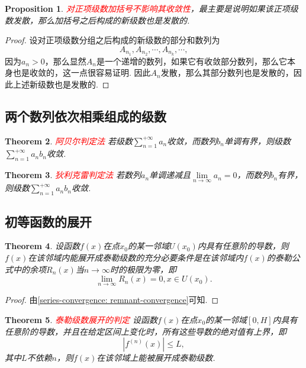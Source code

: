\documentclass{article}
\newtheorem{theorem}{Theorem}[section]
\newtheorem{proposition}[theorem]{Proposition}
\newcommand{\redt}[1]{\textcolor{red}{#1}}
\begin{document}
\begin{proposition}
\rm \redt{对正项级数加括号不影响其收敛性}，最主要是说明如果该正项级数发散，那么加括号之后构成的新级数也是发散的. 
\end{proposition}

\begin{proof}
设对正项级数分组之后构成的新级数的部分和数列为
$$
A_{n_1},A_{n_2},\cdots, A_{n_k},\cdots,
$$
因为$a_n > 0$，那么显然${A_{n}}$是一个递增的数列，如果它有收敛部分数列，那么它本身也是收敛的，这一点很容易证明. 因此${A_{n}}$发散，那么其部分数列也是发散的，因此上述新级数也是发散的. 
\end{proof}

\subsection{两个数列依次相乘组成的级数}


\begin{theorem}
\rm \redt{阿贝尔判定法} 若级数$\sum\limits_{n=1}^{+\infty}a_n$收敛，而数列$b_n$单调有界，则级数$\sum\limits_{n=1}^{+\infty}a_nb_n$收敛. 
\end{theorem}

\begin{theorem}
\rm \redt{狄利克雷判定法} 若数列$a_n$单调递减且$\lim\limits_{n \to \infty} a_n = 0$，而数列$b_n$有界，则级数$\sum\limits_{n=1}^{+\infty} a_nb_n$收敛. 
\end{theorem}

\newpage
\subsection{初等函数的展开}

\begin{theorem}
\rm 设函数$f(x)$在点$x_0$的某一邻域$U(x_0)$内具有任意阶的导数，则$f(x)$在该邻域内能展开成泰勒级数的充分必要条件是在该邻域内$f(x)$的泰勒公式中的余项$R_n(x)$当$n \to \infty$时的极限为零，即
$$
\lim\limits_{n \to \infty} R_n(x) = 0, x \in U(x_0).
$$
\end{theorem}

\begin{proof}
由\ref{series-convergence: remnant-convergence}可知. 
\end{proof}

\begin{theorem}
\rm \redt{泰勒级数展开的判定} 设函数$f(x)$在点$x_0$的某一邻域$[0,H]$内具有任意阶的导数，并且在给定区间上变化时，所有这些导数的绝对值有上界，即
$$
|f^{(n)}(x)| \leq L,
$$
其中$L$不依赖$n$，则$f(x)$在该邻域上能被展开成泰勒级数. 
\end{theorem}
\end{document}
